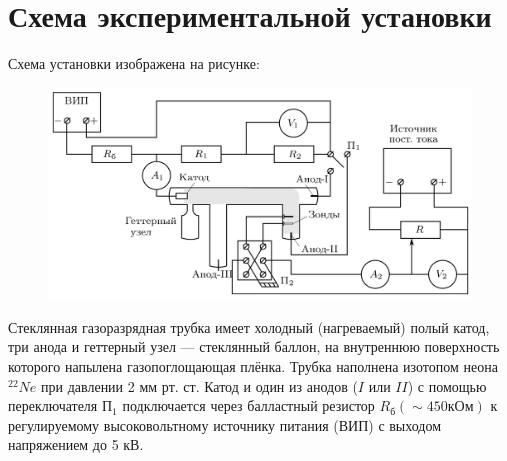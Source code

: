 \section*{Схема экспериментальной установки}

Схема установки изображена на рисунке:

\begin{figure}[H]
	\centering
	\includegraphics[width=1\textwidth]{../res/exp scheme.png}
\end{figure}

Стеклянная газоразрядная трубка имеет холодный (нагреваемый) полый катод, три анода и геттерный узел --- стеклянный баллон, на внутреннюю поверхность которого напылена газопоглощающая плёнка. Трубка наполнена изотопом неона $^{22}Ne$ при давлении 2 мм рт. ст. Катод и один из анодов ($I$ или $II$) с помощью переключателя $П_1$ подключается через балластный резистор $R_б (\sim 450 кОм)$ к регулируемому высоковольтному источнику питания (ВИП) с выходом напряжением до 5 кВ. 